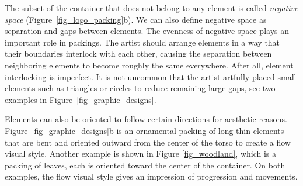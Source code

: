 \newtext
{
The subset of the container that does not belong to any element is
called \textit{negative space} (Figure~\ref{fig_logo_packing}b).
We can also define negative space as separation and gaps between elements.
The evenness of negative space plays an important role in  packings.  
The artist should arrange elements in a way that their boundaries interlock with each other,
causing the separation between neighboring elements to become roughly the same everywhere.
After all, element interlocking is imperfect. It is not uncommon that 
the artist artfully placed small elements such as triangles or circles to reduce remaining large gaps,
see two examples in Figure~\ref{fig_graphic_designs}.
}


\newtext
{
Elements can also be oriented to follow certain directions for aesthetic reasons.
Figure~\ref{fig_graphic_designs}b is an ornamental packing
of long thin elements that are bent and oriented outward from the center of the torso to create a flow visual style.
Another example is shown in Figure \ref{fig_woodland}, which is a packing of leaves, each is oriented toward the center of the container.
On both examples, the flow visual style gives an impression of progression and movements.}

